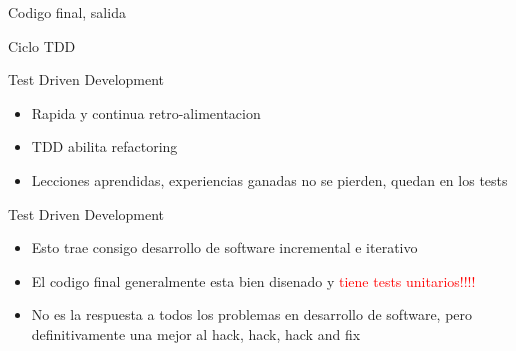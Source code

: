 \begin{frame}{Codigo final, salida} 
\end{frame}


\begin{frame}{Ciclo TDD} 
\end{frame}

\begin{frame}{Test Driven Development} 
    \begin{itemize}
        \item Rapida y continua retro-alimentacion
        \item TDD abilita refactoring
        \item Lecciones aprendidas, experiencias ganadas no se pierden, quedan en los tests
    \end{itemize}
\end{frame}

\begin{frame}{Test Driven Development} 
    \begin{itemize}
        \item Esto trae consigo desarrollo de software incremental e iterativo
        \item El codigo final generalmente esta bien disenado y 
            \textcolor{red}{tiene tests unitarios!!!!}
        \item No es la respuesta a todos los problemas en desarrollo de software, pero
            definitivamente una mejor al hack, hack, hack and fix
    \end{itemize}
\end{frame}
